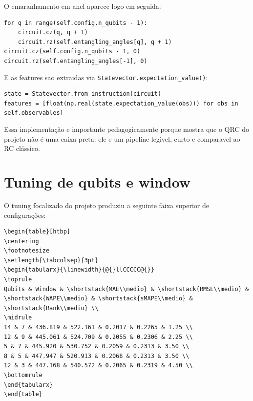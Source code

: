 \documentclass[12pt]{article}
\begin{document}
O emaranhamento em anel aparece logo em seguida:

\begin{verbatim}
for q in range(self.config.n_qubits - 1):
    circuit.cz(q, q + 1)
    circuit.rz(self.entangling_angles[q], q + 1)
circuit.cz(self.config.n_qubits - 1, 0)
circuit.rz(self.entangling_angles[-1], 0)
\end{verbatim}

E as features sao extraidas via \texttt{Statevector.expectation\_value()}:

\begin{verbatim}
state = Statevector.from_instruction(circuit)
features = [float(np.real(state.expectation_value(obs))) for obs in self.observables]
\end{verbatim}

Essa implementação e importante pedagogicamente porque mostra que o QRC do projeto não é uma caixa preta: ele e um pipeline legivel, curto e comparavel ao RC clássico.

\section{Tuning de qubits e window}\label{6-tuning-de-qubits-e-window}

O tuning focalizado do projeto produziu a seguinte faixa superior de configurações:

\begin{verbatim}
\begin{table}[htbp]
\centering
\footnotesize
\setlength{\tabcolsep}{3pt}
\begin{tabularx}{\linewidth}{@{}llCCCCC@{}}
\toprule
Qubits & Window & \shortstack{MAE\\medio} & \shortstack{RMSE\\medio} & \shortstack{WAPE\\medio} & \shortstack{sMAPE\\medio} & \shortstack{Rank\\medio} \\
\midrule
14 & 7 & 436.819 & 522.161 & 0.2017 & 0.2265 & 1.25 \\
12 & 9 & 445.061 & 524.709 & 0.2055 & 0.2306 & 2.25 \\
5 & 7 & 445.920 & 530.752 & 0.2059 & 0.2313 & 3.50 \\
8 & 5 & 447.947 & 520.913 & 0.2068 & 0.2313 & 3.50 \\
12 & 3 & 447.168 & 540.572 & 0.2065 & 0.2319 & 4.50 \\
\bottomrule
\end{tabularx}
\end{table}
\end{verbatim}
\end{document}
